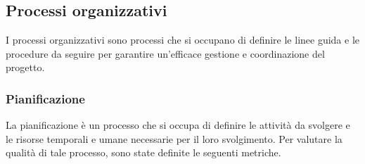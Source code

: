 \subsection{Processi organizzativi}
I processi organizzativi sono processi che si occupano di definire le linee guida e le procedure da seguire per garantire un'efficace gestione e coordinazione del progetto.

\subsubsection{Pianificazione}
La pianificazione è un processo che si occupa di definire le attività da svolgere e le risorse temporali e umane necessarie per il loro svolgimento. Per valutare la qualità di tale processo, sono state definite le seguenti metriche.

